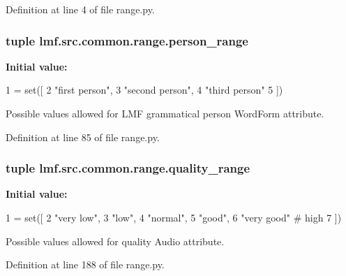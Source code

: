 Definition at line 4 of file range.\+py.

\hypertarget{namespacelmf_1_1src_1_1common_1_1range_ad711c6c7c0e62384f61b106ec7bf2af0}{
\subsubsection[{person\+\_\+range}]{\setlength{\rightskip}{0pt plus 5cm}tuple lmf.\+src.\+common.\+range.\+person\+\_\+range}}\label{namespacelmf_1_1src_1_1common_1_1range_ad711c6c7c0e62384f61b106ec7bf2af0}
{\bfseries Initial value\+:}
\begin{DoxyCode}
1 = set([
2     \textcolor{stringliteral}{"first person"},
3     \textcolor{stringliteral}{"second person"},
4     \textcolor{stringliteral}{"third person"}
5 ])
\end{DoxyCode}


Possible values allowed for L\+M\+F grammatical person Word\+Form attribute. 



Definition at line 85 of file range.\+py.

\hypertarget{namespacelmf_1_1src_1_1common_1_1range_a6aef6275dfffea6c0ebf4f105ae35b64}{
\subsubsection[{quality\+\_\+range}]{\setlength{\rightskip}{0pt plus 5cm}tuple lmf.\+src.\+common.\+range.\+quality\+\_\+range}}\label{namespacelmf_1_1src_1_1common_1_1range_a6aef6275dfffea6c0ebf4f105ae35b64}
{\bfseries Initial value\+:}
\begin{DoxyCode}
1 = set([
2     \textcolor{stringliteral}{"very low"},
3     \textcolor{stringliteral}{"low"},
4     \textcolor{stringliteral}{"normal"},
5     \textcolor{stringliteral}{"good"},
6     \textcolor{stringliteral}{"very good"} \textcolor{comment}{# high}
7 ])
\end{DoxyCode}


Possible values allowed for quality Audio attribute. 



Definition at line 188 of file range.\+py.

